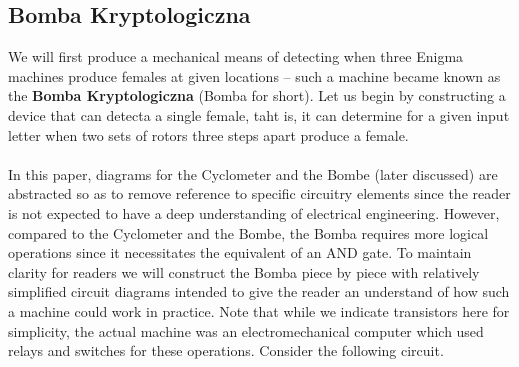 \subsection{Bomba Kryptologiczna}
We will first produce a mechanical means of detecting when three Enigma machines produce females at given locations -- such a machine became known as the {\bf{Bomba Kryptologiczna}} (Bomba for short). Let us begin by constructing a device that can detecta a single female, taht is, it can determine for a given input letter when two sets of rotors three steps apart produce a female.
\\\\In this paper, diagrams for the Cyclometer and the Bombe (later discussed) are abstracted so as to remove reference to specific circuitry elements since the reader is not expected to have a deep understanding of electrical engineering. However, compared to the Cyclometer and the Bombe, the Bomba requires more logical operations since it necessitates the equivalent of an AND gate. To maintain clarity for readers we will construct the Bomba piece by piece with relatively simplified circuit diagrams intended to give the reader an understand of how such a machine could work in practice. Note that while we indicate transistors here for simplicity, the actual machine was an electromechanical computer which used relays and switches for these operations. Consider the following circuit.

